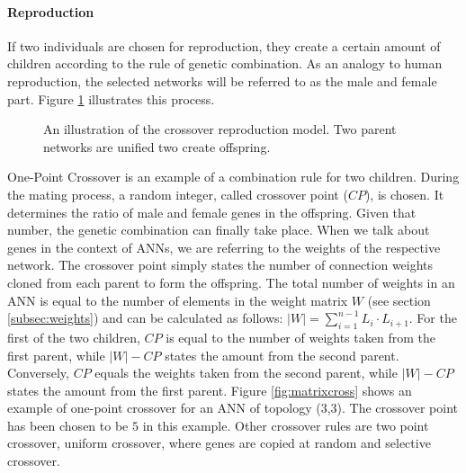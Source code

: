 \documentclass[10pt,a4paper,DIV=11]{scrreprt}
\begin{document}
\paragraph{Reproduction}
If two individuals are chosen for reproduction, they create a certain amount of children according to the rule of genetic combination. 
As an analogy to human reproduction, the selected networks will be referred to as the male and female part. Figure \ref{fig:repro} illustrates 
this process. 

\begin{figure}[H]
	\centering
	\caption{An illustration of the crossover reproduction model. Two parent networks are unified two create offspring.}
	\label{fig:repro}
\end{figure}

One-Point Crossover is an example of a combination rule for two children. During the mating process, a random integer, called crossover point ($CP$),
is chosen. It determines the ratio of male and female genes in the offspring. Given that number, the genetic combination can finally take place.
When we talk about genes in the context of ANNs, we are referring to the weights of the respective network. The crossover point simply states the number 
of connection weights cloned from each parent to form the offspring. The total number of weights in an ANN is equal to the number of elements in the 
weight matrix $W$ (see section \ref{subsec:weights}) and can be calculated as follows: $|W| = \sum^{n-1}_{i=1} L_i \cdot L_{i+1}$. 
For the first of the two children, $CP$ is equal to the number of weights taken from the first parent, while $|W|-CP$ states the amount from the 
second parent. Conversely, $CP$ equals the weights taken from the second parent, while $|W|-CP$ states the amount from the first parent. 
Figure \ref{fig:matrixcross} shows an example of one-point crossover for an ANN of topology (3,3). The crossover point has been chosen to be $5$ in 
this example. Other crossover rules are two point crossover, uniform crossover, where genes are copied at random \cite{UNIFORMCROSSOVER} and selective 
crossover\cite{SELECTCROSSOVER}.
\end{document}

